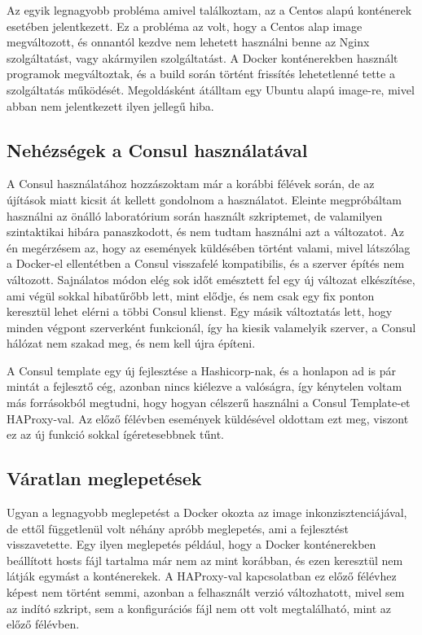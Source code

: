 \documentclass[11pt,magyar,a4paper,twoside,]{report}
\begin{document}
Az egyik legnagyobb probléma amivel találkoztam, az a Centos alapú
konténerek esetében jelentkezett. Ez a probléma az volt, hogy a Centos
alap image megváltozott, és onnantól kezdve nem lehetett használni benne
az Nginx szolgáltatást, vagy akármyilen szolgáltatást. A Docker
konténerekben használt programok megváltoztak, és a build során történt
frissítés lehetetlenné tette a szolgáltatás működését. Megoldásként
átálltam egy Ubuntu alapú image-re, mivel abban nem jelentkezett ilyen
jellegű hiba.

\subsection{Nehézségek a Consul
használatával}\label{nehuxe9zsuxe9gek-a-consul-hasznuxe1latuxe1val}

A Consul használatához hozzászoktam már a korábbi félévek során, de az
újítások miatt kicsit át kellett gondolnom a használatot. Eleinte
megpróbáltam használni az önálló laboratórium során használt
szkriptemet, de valamilyen szintaktikai hibára panaszkodott, és nem
tudtam használni azt a változatot. Az én megérzésem az, hogy az
események küldésében történt valami, mivel látszólag a Docker-el
ellentétben a Consul visszafelé kompatibilis, és a szerver építés nem
változott. Sajnálatos módon elég sok időt emésztett fel egy új változat
elkészítése, ami végül sokkal hibatűrőbb lett, mint elődje, és nem csak
egy fix ponton keresztül lehet elérni a többi Consul klienst. Egy másik
változtatás lett, hogy minden végpont szerverként funkcionál, így ha
kiesik valamelyik szerver, a Consul hálózat nem szakad meg, és nem kell
újra építeni.

A Consul template egy új fejlesztése a Hashicorp-nak, és a honlapon ad
is pár mintát a fejlesztő cég, azonban nincs kiélezve a valóságra, így
kénytelen voltam más forrásokból megtudni, hogy hogyan célszerű
használni a Consul Template-et HAProxy-val. Az előző félévben események
küldésével oldottam ezt meg, viszont ez az új funkció sokkal
ígéretesebbnek tűnt.

\subsection{Váratlan meglepetések}\label{vuxe1ratlan-meglepetuxe9sek}

Ugyan a legnagyobb meglepetést a Docker okozta az image
inkonzisztenciájával, de ettől függetlenül volt néhány apróbb
meglepetés, ami a fejlesztést visszavetette. Egy ilyen meglepetés
például, hogy a Docker konténerekben beállított hosts fájl tartalma már
nem az mint korábban, és ezen keresztül nem látják egymást a
konténerekek. A HAProxy-val kapcsolatban ez előző félévhez képest nem
történt semmi, azonban a felhasznált verzió változhatott, mivel sem az
indító szkript, sem a konfigurációs fájl nem ott volt megtalálható, mint
az előző félévben.
\end{document}
